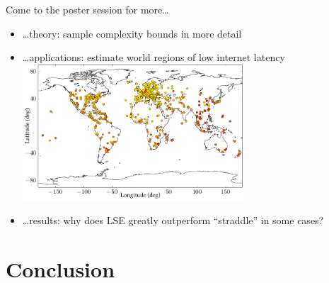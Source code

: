 \documentclass[10pt,mathserif]{beamer}
\newcommand{\acl}{\textsf{LSE}\xspace}
\begin{document}
\begin{frame}
\begin{center}
\large Come to the poster session for more\ldots
\end{center}
\begin{itemize}
\item<2-> \ldots theory: sample complexity bounds in more detail
\item<3-> \ldots applications: estimate world regions of low internet latency\\[0.5em]
\hspace{3em}\includegraphics[height=2in]{figures/map}
\item<4-> \ldots results: why does \acl greatly outperform ``straddle'' in some cases?
\end{itemize}
\end{frame}

\section*{Conclusion}
\end{document}
